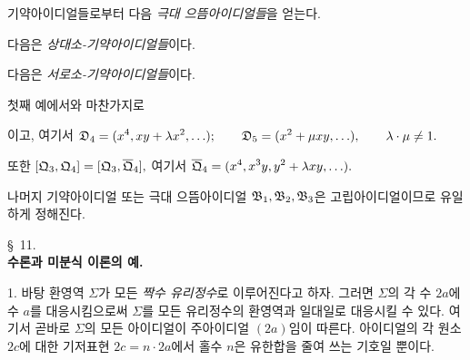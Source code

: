 기약아이디얼들로부터 다음 \emph{극대 으뜸아이디얼들}을 얻는다.
\par\medskip
\noindent{}\par\medskip
다음은 \emph{상대소-기약아이디얼들}이다.
\par\smallskip
\noindent{}\par\medskip
다음은 \emph{서로소-기약아이디얼들}이다.
\par\smallskip
\noindent{}\par
\noindent{}\par\medskip
첫째 예에서와 마찬가지로
\par\smallskip
\noindent{}\par
이고, 여기서
\noindent\(\displaystyle
 \mathfrak{D}_4=(x^4,xy+\lambda x^2,\ldots);\qquad
 \mathfrak{D}_5=(x^2+\mu xy,\ldots),\qquad \lambda\cdot\mu\ne1.
\)\par
또한
\noindent\(\displaystyle [\mathfrak{Q}_3,\mathfrak{Q}_4]=[\mathfrak{Q}_3,\overline{\mathfrak{Q}}_4],\)\quad
여기서 \(\displaystyle \overline{\mathfrak{Q}}_4=(x^4,x^3y,y^2+\lambda xy,\ldots).\)\par
나머지 기약아이디얼 또는 극대 으뜸아이디얼 $\mathfrak{B}_1,\mathfrak{B}_2,\mathfrak{B}_3$은 고립아이디얼이므로 유일하게 정해진다.

\begin{center}
\S~11.\\[0.25em]
\textbf{수론과 미분식 이론의 예.}
\end{center}

1. 바탕 환영역 $\Sigma$가 모든 \emph{짝수 유리정수}로 이루어진다고 하자. 그러면 $\Sigma$의 각 수 $2a$에 수 $a$를 대응시킴으로써 $\Sigma$를 모든 유리정수의 환영역과 일대일로 대응시킬 수 있다. 여기서 곧바로 $\Sigma$의 모든 아이디얼이 주아이디얼 $(2a)$임이 따른다. 아이디얼의 각 원소 $2c$에 대한 기저표현 $2c=n\cdot2a$에서 홀수 $n$은 유한합을 줄여 쓰는 기호일 뿐이다.

